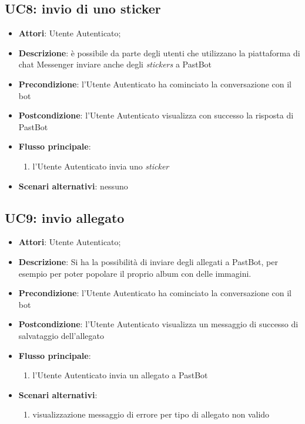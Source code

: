 
\subsection{UC8: invio di uno sticker}
\label{uc:uc8}

\begin{itemize}
  \item \textbf{Attori}: Utente Autenticato;
  \item \textbf{Descrizione}: è possibile da parte degli utenti che utilizzano
la piattaforma di chat Messenger inviare anche degli \textit{stickers} a PastBot
  \item \textbf{Precondizione}: l'Utente Autenticato ha cominciato la
conversazione con il bot
  \item \textbf{Postcondizione}: l'Utente Autenticato visualizza con successo
la risposta di PastBot
  \item \textbf{Flusso principale}:
  \begin{enumerate}
    \item l'Utente Autenticato invia uno \textit{sticker}
  \end{enumerate}
  \item \textbf{Scenari alternativi}: nessuno
\end{itemize}



\subsection{UC9: invio allegato}
\label{uc:uc9}

\begin{itemize}
  \item \textbf{Attori}: Utente Autenticato;
  \item \textbf{Descrizione}: Si ha la possibilità di inviare degli allegati a
PastBot, per esempio per poter popolare il proprio album con delle immagini.
  \item \textbf{Precondizione}: l'Utente Autenticato ha cominciato la
conversazione con il bot
  \item \textbf{Postcondizione}: l'Utente Autenticato visualizza un messaggio
di successo di salvataggio dell'allegato
  \item \textbf{Flusso principale}:
  \begin{enumerate}
    \item l'Utente Autenticato invia un allegato a PastBot
  \end{enumerate}
  \item \textbf{Scenari alternativi}:
  \begin{enumerate}
    \item visualizzazione messaggio di errore per tipo di allegato non valido
  \end{enumerate}
\end{itemize}


